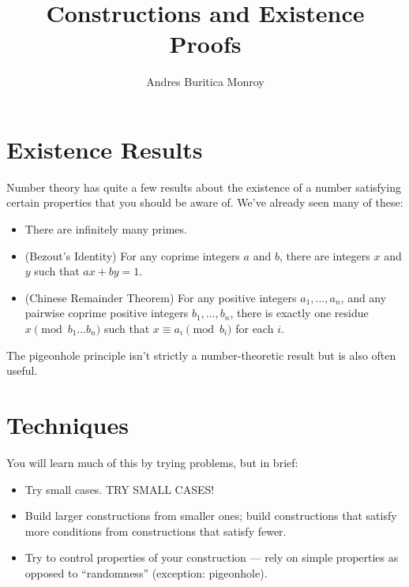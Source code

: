 \documentclass{article}
\title{Constructions and Existence Proofs}
\author{Andres Buritica Monroy}
\date{}
\begin{document}
\maketitle
\section{Existence Results}
Number theory has quite a few results about the existence of a number satisfying
certain properties that you should be aware of. We've already seen many of
these:
\begin{itemize}
  \item There are infinitely many primes.
  \item (Bezout's Identity)
    For any coprime integers $a$ and $b$, there are integers $x$ and $y$ such
    that $ax+by=1$.
  \item (Chinese Remainder Theorem)
    For any positive integers $a_1,\ldots,a_n$, and any pairwise coprime positive
    integers $b_1,\ldots,b_n$, there is exactly one residue $x\pmod {b_1\ldots
    b_n}$ such that $x\equiv a_i\pmod{b_i}$ for each $i$.
\end{itemize}
The pigeonhole principle isn't strictly a number-theoretic result but is also
often useful. 
\section{Techniques}
You will learn much of this by trying problems, but in brief:
\begin{itemize}
  \item Try small cases. TRY SMALL CASES!\@
  \item Build larger constructions from smaller ones; build constructions that
    satisfy more conditions from constructions that satisfy fewer.
  \item Try to control properties of your construction --- rely on simple
    properties as opposed to ``randomness'' (exception: pigeonhole).
\end{itemize}
\newpage
\end{document}
